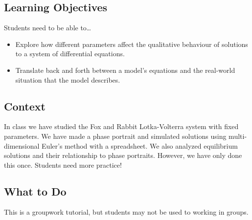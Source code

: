 \subsection*{Learning Objectives} Students need to be able to\ldots
	\begin{itemize}
		\item Explore how different parameters affect the qualitative
			behaviour of solutions to a system of differential equations.
		\item Translate back and forth between a model's equations and
			the real-world situation that the model describes.
	\end{itemize}


	\subsection*{Context} In class we have studied the Fox and Rabbit
	Lotka-Volterra system with fixed parameters. We have made a phase portrait
	and simulated solutions using multi-dimensional Euler's method with
	a spreadsheet. We also analyzed equilibrium solutions and their
	relationship to phase portraits. However, we have only done this once.
	Students need more practice!


\subsection*{What to Do} This is a groupwork tutorial,
	but students may not be used to working in groups.


